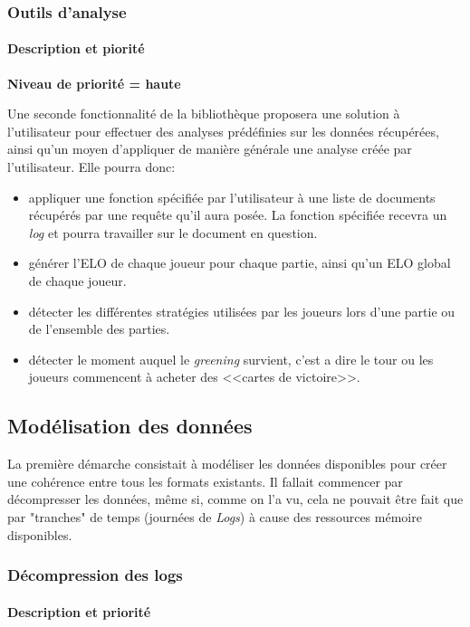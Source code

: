 \subsubsection{Outils d'analyse}

\paragraph*{Description et piorité}

\textbf{Niveau de priorité = haute}

Une seconde fonctionnalité de la  bibliothèque proposera une solution à l'utilisateur pour effectuer des analyses prédéfinies sur les données récupérées, ainsi qu'un moyen d'appliquer de manière générale une analyse créée par l'utilisateur. Elle pourra donc:
\begin{itemize}
\item appliquer une fonction spécifiée par l'utilisateur à une liste de documents récupérés par une requête qu'il aura posée. La fonction spécifiée recevra un \textit{log} et pourra travailler sur le document en question.
\item générer l'ELO de chaque joueur pour chaque partie, ainsi qu'un ELO global de chaque joueur.
\item détecter les différentes stratégies utilisées par les joueurs lors d'une partie ou de l'ensemble des parties.
\item détecter le moment auquel le \textit{greening} survient, c'est a dire le tour ou les joueurs commencent à acheter des <<cartes de victoire>>.
\end{itemize}

\subsection{Modélisation des données}
La première démarche consistait à modéliser les données disponibles pour créer une cohérence entre tous les formats existants. Il fallait commencer par décompresser les données, même si, comme on l'a vu, cela ne pouvait être fait que par "tranches" de temps (journées de \textit{Logs}) à cause des ressources mémoire disponibles. 

\subsubsection{Décompression des logs}
\paragraph*{Description et priorité} 



